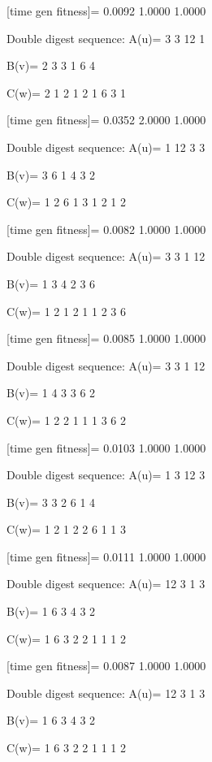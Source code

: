 [time gen fitness]=
    0.0092    1.0000    1.0000

Double digest sequence:
A(u)=
     3     3    12     1

B(v)=
     2     3     3     1     6     4

C(w)=
     2     1     2     1     2     1     6     3     1

[time gen fitness]=
    0.0352    2.0000    1.0000

Double digest sequence:
A(u)=
     1    12     3     3

B(v)=
     3     6     1     4     3     2

C(w)=
     1     2     6     1     3     1     2     1     2

[time gen fitness]=
    0.0082    1.0000    1.0000

Double digest sequence:
A(u)=
     3     3     1    12

B(v)=
     1     3     4     2     3     6

C(w)=
     1     2     1     2     1     1     2     3     6

[time gen fitness]=
    0.0085    1.0000    1.0000

Double digest sequence:
A(u)=
     3     3     1    12

B(v)=
     1     4     3     3     6     2

C(w)=
     1     2     2     1     1     1     3     6     2

[time gen fitness]=
    0.0103    1.0000    1.0000

Double digest sequence:
A(u)=
     1     3    12     3

B(v)=
     3     3     2     6     1     4

C(w)=
     1     2     1     2     2     6     1     1     3

[time gen fitness]=
    0.0111    1.0000    1.0000

Double digest sequence:
A(u)=
    12     3     1     3

B(v)=
     1     6     3     4     3     2

C(w)=
     1     6     3     2     2     1     1     1     2

[time gen fitness]=
    0.0087    1.0000    1.0000

Double digest sequence:
A(u)=
    12     3     1     3

B(v)=
     1     6     3     4     3     2

C(w)=
     1     6     3     2     2     1     1     1     2

